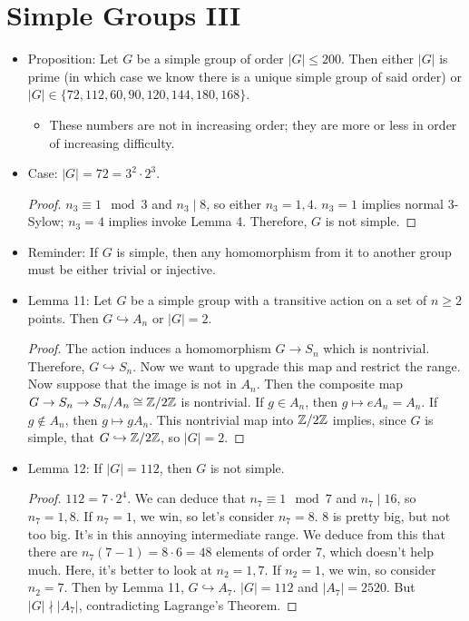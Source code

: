 \documentclass[../notes.tex]{subfiles}
\begin{document}
\section{Simple Groups III}
\begin{itemize}
    \item {}Proposition: Let $G$ be a simple group of order $|G|\leq 200$. Then either $|G|$ is prime (in which case we know there is a unique simple group of said order) or $|G|\in\{72,112,60,90,120,144,180,168\}$.
    \begin{itemize}
        \item These numbers are not in increasing order; they are more or less in order of increasing difficulty.
    \end{itemize}
    \item Case: $|G|=72=3^2\cdot 2^3$.
    \begin{proof}
        $n_3\equiv 1\mod 3$ and $n_3\mid 8$, so either $n_3=1,4$. $n_3=1$ implies normal 3-Sylow; $n_3=4$ implies invoke Lemma 4. Therefore, $G$ is not simple.
    \end{proof}
    \item Reminder: If $G$ is simple, then any homomorphism from it to another group must be either trivial or injective.
    \item Lemma 11: Let $G$ be a simple group with a transitive action on a set of $n\geq 2$ points. Then $G\hookrightarrow A_n$ or $|G|=2$.
    \begin{proof}
        The action induces a homomorphism $G\to S_n$ which is nontrivial. Therefore, $G\hookrightarrow S_n$. Now we want to upgrade this map and restrict the range. Now suppose that the image is not in $A_n$. Then the composite map $G\to S_n\to S_n/A_n\cong\mathbb{Z}/2\mathbb{Z}$ is nontrivial. If $g\in A_n$, then $g\mapsto eA_n=A_n$. If $g\notin A_n$, then $g\mapsto gA_n$. This nontrivial map into $\mathbb{Z}/2\mathbb{Z}$ implies, since $G$ is simple, that $G\hookrightarrow\mathbb{Z}/2\mathbb{Z}$, so $|G|=2$.
    \end{proof}
    \item Lemma 12: If $|G|=112$, then $G$ is not simple.
    \begin{proof}
        $112=7\cdot 2^4$. We can deduce that $n_7\equiv 1\mod 7$ and $n_7\mid 16$, so $n_7=1,8$. If $n_7=1$, we win, so let's consider $n_7=8$. 8 is pretty big, but not too big. It's in this annoying intermediate range. We deduce from this that there are $n_7(7-1)=8\cdot 6=48$ elements of order 7, which doesn't help much. Here, it's better to look at $n_2=1,7$. If $n_2=1$, we win, so consider $n_2=7$. Then by Lemma 11, $G\hookrightarrow A_7$. $|G|=112$ and $|A_7|=2520$. But $|G|\nmid |A_7|$, contradicting Lagrange's Theorem.

\end{proof}
\end{itemize}
\end{document}
